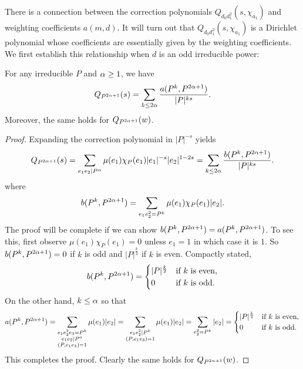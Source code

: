 \documentclass[12pt,reqno,oneside]{amsart}
\begin{document}
    There is a connection between the correction polynomials $Q_{d_{0}d_{1}^{2}}(s,\chi_{a_{1}})$ and weighting coefficients $a(m,d)$. It will turn out that $Q_{d_{0}d_{1}^{2}}(s,\chi_{a_{1}})$ is a Dirichlet polynomial whose coefficients are essentially given by the weighting coefficients. We first establish this relationship when $d$ is an odd irreducible power:

    \begin{lemma}\label{lem:prime_correction_odd}
        For any irreducible $P$ and $\alpha \ge 1$, we have
        \[
            Q_{P^{2\alpha+1}}(s) = \sum_{k \le 2\alpha}\frac{a(P^{k},P^{2\alpha+1})}{|P|^{ks}}.
        \]
        Moreover, the same holds for $Q_{P^{2\alpha+1}}(w)$.
    \end{lemma}
    \begin{proof}
        Expanding the correction polynomial in $|P|^{-s}$ yields
        \[
            Q_{P^{2\alpha+1}}(s) = \sum_{e_{1}e_{2} \mid P^{\alpha}}\mu(e_{1})\chi_{P}(e_{1})|e_{1}|^{-s}|e_{2}|^{1-2s} = \sum_{k \le 2\alpha}\frac{b(P^{k},P^{2\alpha+1})}{|P|^{ks}}.
        \]
        where
        \[
            b(P^{k},P^{2\alpha+1}) = \sum_{e_{1}e_{2}^{2} = P^{k}}\mu(e_{1})\chi_{P}(e_{1})|e_{2}|.
        \]
        The proof will be complete if we can show $b(P^{k},P^{2\alpha+1}) = a(P^{k},P^{2\alpha+1})$. To see this, first observe $\mu(e_{1})\chi_{P}(e_{1}) = 0$ unless $e_{1} = 1$ in which case it is $1$. So $b(P^{k},P^{2\alpha+1}) = 0$ if $k$ is odd and $|P|^{\frac{k}{2}}$ if $k$ is even. Compactly stated,
        \[
            b(P^{k},P^{2\alpha+1}) = \begin{cases} |P|^{\frac{k}{2}} & \text{if $k$ is even}, \\ 0 & \text{if $k$ is odd}. \end{cases}
        \]
        On the other hand, $k \le \alpha$ so that
        \[
            a(P^{k},P^{2\alpha+1}) = \sum_{\substack{e_{1}e_{2}^{2}e_{3} = P^{k} \\ e_{1}e_{2} \mid P^{\alpha} \\ (P,e_{1}e_{3}) = 1}}\mu(e_{1})|e_{2}| = \sum_{\substack{e_{1}e_{2}^{2} \mid P^{k} \\ (P,e_{1}e_{3}) = 1}}\mu(e_{1})|e_{2}| = \sum_{e_{2}^{2} = P^{k}}|e_{2}| =  \begin{cases} |P|^{\frac{k}{2}} & \text{if $k$ is even}, \\ 0 & \text{if $k$ is odd}. \end{cases}
        \]
        This completes the proof. Clearly the same holds for $Q_{P^{2\alpha+1}}(w)$.
    \end{proof}
\end{document}
